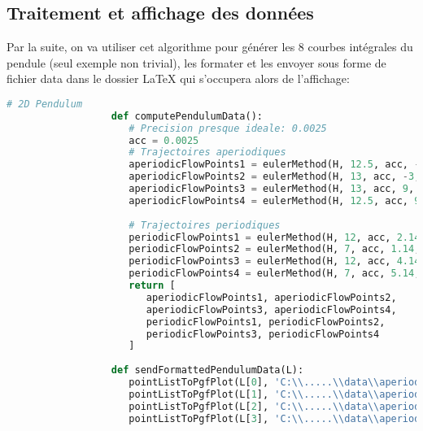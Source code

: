\documentclass{report}
\begin{document}
      \subsection{Traitement et affichage des données}
         Par la suite, on va utiliser cet algorithme pour générer les 8 courbes intégrales du pendule (seul exemple non trivial), les formater et les envoyer sous forme de fichier data dans le dossier LaTeX qui s'occupera alors de l'affichage:
         \begin{center}
            \begin{lstlisting}[language=Python, caption=Méthode d'Euler générale]
                  # 2D Pendulum
                  def computePendulumData():
                     # Precision presque ideale: 0.0025
                     acc = 0.0025
                     # Trajectoires aperiodiques
                     aperiodicFlowPoints1 = eulerMethod(H, 12.5, acc, -3, 2) # Longueur d'arc 12.5
                     aperiodicFlowPoints2 = eulerMethod(H, 13, acc, -3, 1) # Longueur d'arc 13
                     aperiodicFlowPoints3 = eulerMethod(H, 13, acc, 9, -1) # Longueur d'arc 13
                     aperiodicFlowPoints4 = eulerMethod(H, 12.5, acc, 9, -2) # Longueur d'arc 12.5
                  
                     # Trajectoires periodiques
                     periodicFlowPoints1 = eulerMethod(H, 12, acc, 2.14, 0) # Longueur d'arc 12
                     periodicFlowPoints2 = eulerMethod(H, 7, acc, 1.14, 0) # Longueur d'arc 7
                     periodicFlowPoints3 = eulerMethod(H, 12, acc, 4.14, 0) # Longueur d'arc 12
                     periodicFlowPoints4 = eulerMethod(H, 7, acc, 5.14, 0) # Longueur d'arc 7
                     return [
                        aperiodicFlowPoints1, aperiodicFlowPoints2, 
                        aperiodicFlowPoints3, aperiodicFlowPoints4, 
                        periodicFlowPoints1, periodicFlowPoints2, 
                        periodicFlowPoints3, periodicFlowPoints4
                     ]
                  
                  def sendFormattedPendulumData(L):
                     pointListToPgfPlot(L[0], 'C:\\.....\\data\\aperiodic1.dat')
                     pointListToPgfPlot(L[1], 'C:\\.....\\data\\aperiodic2.dat')
                     pointListToPgfPlot(L[2], 'C:\\.....\\data\\aperiodic3.dat')
                     pointListToPgfPlot(L[3], 'C:\\.....\\data\\aperiodic4.dat')
                  

\end{lstlisting}
\end{center}
\end{document}
